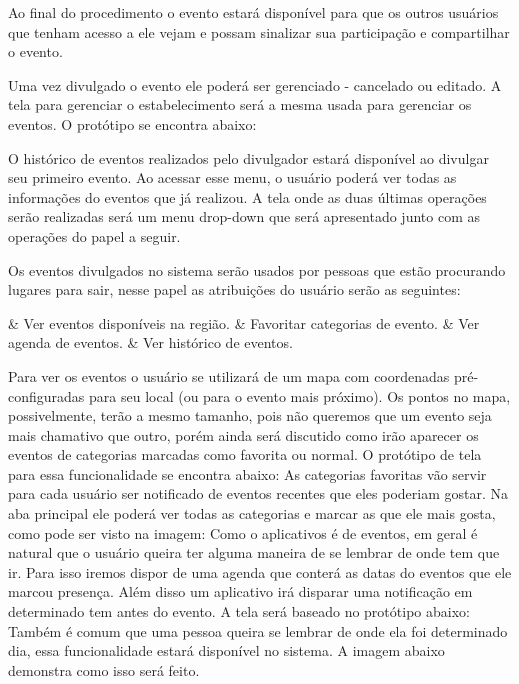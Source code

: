 \documentclass{article}
\begin{document}
	\bigskip
	Ao final do procedimento o evento estará disponível para que os outros usuários que tenham acesso a ele vejam e possam sinalizar sua participação e compartilhar o evento.  
	
	Uma vez divulgado o evento ele poderá ser gerenciado - cancelado ou editado. A tela para gerenciar o estabelecimento será a mesma usada para gerenciar os eventos. O protótipo se encontra abaixo:
	
	
	O histórico de eventos realizados pelo divulgador estará disponível ao divulgar seu primeiro evento. Ao acessar esse menu, o usuário poderá ver todas as informações do eventos que já realizou. A tela onde as duas últimas operações serão realizadas será um menu drop-down que será apresentado junto com as operações do papel a seguir.
	
	Os eventos divulgados no sistema serão usados por pessoas que estão procurando lugares para sair, nesse papel as atribuições do usuário serão as seguintes:\medskip
	\begin{easylist}[itemize]
	& Ver eventos disponíveis na região.
	& Favoritar categorias de evento.
	& Ver agenda de eventos.
	& Ver histórico de eventos.
	\end{easylist}\medskip
	
	Para ver os eventos o usuário se utilizará de um mapa com coordenadas pré-configuradas para seu local (ou para o evento mais próximo). Os pontos no mapa, possivelmente, terão a mesmo tamanho, pois não queremos que um evento seja mais chamativo que outro, porém ainda será discutido como irão aparecer os eventos de categorias marcadas como favorita ou normal. O protótipo de tela para essa funcionalidade se encontra abaixo:
	As categorias favoritas vão servir para cada usuário ser notificado de eventos recentes que eles poderiam gostar. Na aba principal ele poderá ver todas as categorias e marcar as que ele mais gosta, como pode ser visto na imagem: 
	Como o aplicativos é de eventos, em geral é natural que o usuário queira ter alguma maneira de se lembrar de onde tem que ir. Para isso iremos dispor de uma agenda que conterá as datas do eventos que ele marcou presença. Além disso um aplicativo irá disparar uma notificação em determinado tem antes do evento. A tela será baseado no protótipo abaixo:
	Também é comum que uma pessoa queira se lembrar de onde ela foi determinado dia, essa funcionalidade estará disponível no sistema. A imagem abaixo demonstra como isso será feito.
	 
\end{document}
